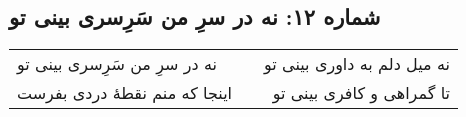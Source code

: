 \begin{center}
\section*{شماره ۱۲: نه در سرِ من سَرِسری بینی تو}
\label{sec:012}
\begin{longtable}{l p{0.5cm} r}
نه در سرِ من سَرِسری بینی تو
&&
نه میل دلم به داوری بینی تو
\\
اینجا که منم نقطهٔ دردی بفرست
&&
تا گمراهی و کافری بینی تو
\\
\end{longtable}
\end{center}
